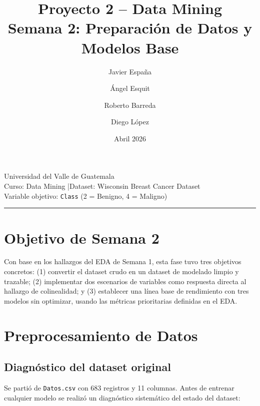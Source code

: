 \documentclass[11pt,a4paper]{article}
\title{\textbf{Proyecto 2 -- Data Mining}\\[0.4em]
       \large Semana 2: Preparación de Datos y Modelos Base}
\author{Javier España \and Ángel Esquit \and Roberto Barreda \and Diego López}
\date{Abril 2026}
\begin{document}
\maketitle
\thispagestyle{empty}

\begin{center}
\large Universidad del Valle de Guatemala\\[0.2em]
\normalsize Curso: Data Mining \quad|\quad Dataset: Wisconsin Breast Cancer Dataset\\[0.2em]
Variable objetivo: \texttt{Class} \;(2 = Benigno, 4 = Maligno)
\end{center}

\vspace{0.5em}\hrule\vspace{0.5em}

\tableofcontents
\newpage

\section{Objetivo de Semana 2}

Con base en los hallazgos del EDA de Semana 1, esta fase tuvo tres objetivos concretos: (1) convertir el dataset crudo en un dataset de modelado limpio y trazable; (2) implementar dos escenarios de variables como respuesta directa al hallazgo de colinealidad; y (3) establecer una línea base de rendimiento con tres modelos sin optimizar, usando las métricas prioritarias definidas en el EDA.

\section{Preprocesamiento de Datos}

\subsection{Diagnóstico del dataset original}

Se partió de \texttt{Datos.csv} con 683 registros y 11 columnas. Antes de entrenar cualquier modelo se realizó un diagnóstico sistemático del estado del dataset:
\end{document}

